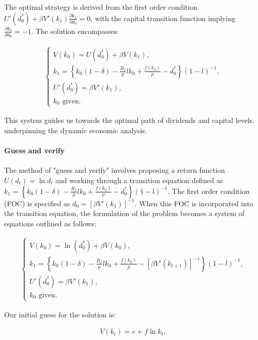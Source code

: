 \documentclass[12pt]{article}
\begin{document}
The optimal strategy is derived from the first order condition \(U'(d_0^*) + \beta V'(k_1) \frac{\partial k_1}{\partial d_0} = 0\), with  the  capital transition function implying \(\frac{\partial k_1}{\partial d_0} = -1\). The solution
encompasses:


\begin{align*}
    \begin{cases}
        V(k_0) = U(d_0^*) + \beta V(k_1), \\
        k_1 = \left\{k_0(1 - \delta) - \frac{R_f}{p} l k_0 + \frac{f(k_0)}{p} - d_0^*\right\}(1-l)^{-1}, \\
        U'(d_0^*) = \beta V'(k_1), \\
        k_0 \text{ given.}
    \end{cases}
\end{align*}


This system guides us towards the optimal path of dividends and capital levels, underpinning the dynamic economic analysis.

\paragraph{Guess and verify}
The method of "guess and verify" involves proposing a return function \(U(d_t) = \ln{d_t}\) and working through a
transition equation defined as \(k_1 = \left\{k_0(1 - \delta) - \frac{R_f}{p} l k_0 + \frac{f(k_0)}{p} -
d^*_0\right\}{(1-l)}^{-1}\). The first order condition (FOC) is specified as \(d_0 = [\beta V'(k_{1})]^{-1}\). When this
FOC is incorporated into the transition equation, the formulation of the problem becomes a system of equations outlined
as follows:


\begin{align*}
    \begin{cases}
        V(k_0) = \ln(d_0^*) + \beta V(k_0), \\
        k_1 = \left\{k_0(1 - \delta) - \frac{R_f}{p} l k_0 + \frac{f(k_0)}{p} - [\beta V'(k_{t+1})]^{-1} \right\}{(1-l)}^{-1}, \\
        U'(d_0^*) = \beta V'(k_1), \\
        k_0 \text{ given.}
    \end{cases}
\end{align*}


Our initial guess for the solution is:


\begin{align*}
    V(k_t) = e + f \ln{k_t},
\end{align*}
\end{document}
